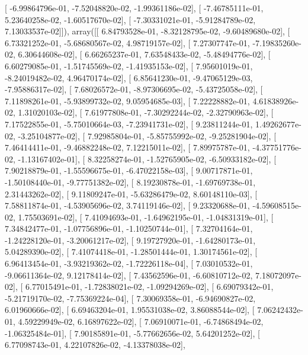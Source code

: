 \documentclass{article}
\begin{document}
       [ -6.99864796e-01,  -7.52048820e-02,  -1.99361186e-02],
       [ -7.46785111e-01,   5.23640258e-02,  -1.60517670e-02],
       [ -7.30331021e-01,  -5.91284789e-02,   7.13033537e-02]]), array([[  6.84793528e-01,  -8.32128795e-02,  -9.60489680e-02],
       [  6.73321252e-01,  -5.68680567e-02,   4.98719157e-02],
       [  7.27307747e-01,  -7.19835260e-02,   6.30644608e-02],
       [  6.66265237e-01,   7.63548433e-02,  -5.48494776e-02],
       [  6.60279085e-01,  -1.51745569e-02,  -1.41935153e-02],
       [  7.95601019e-01,  -8.24019482e-02,   4.96470174e-02],
       [  6.85641230e-01,  -9.47065129e-03,  -7.95886317e-02],
       [  7.68026572e-01,  -8.97306695e-02,  -5.43725058e-02],
       [  7.11898261e-01,  -5.93899732e-02,   9.05954685e-03],
       [  7.22228882e-01,   4.61838926e-02,   1.31020103e-02],
       [  7.61977808e-01,  -7.30292244e-02,  -2.32790963e-02],
       [  7.17522855e-01,  -5.75010664e-03,  -7.23941731e-02],
       [  9.23811244e-01,   1.49262677e-02,  -3.25104877e-02],
       [  7.92985804e-01,  -5.85755992e-02,  -9.25281904e-02],
       [  7.46414411e-01,  -9.46882248e-02,   7.12215011e-02],
       [  7.89975787e-01,  -4.37751776e-02,  -1.13167402e-01],
       [  8.32258274e-01,  -1.52765905e-02,  -6.50933182e-02],
       [  7.90218879e-01,  -1.55596675e-01,  -6.47022158e-03],
       [  9.00717871e-01,  -1.50108440e-01,  -9.77751382e-02],
       [  8.19230878e-01,  -1.69769738e-01,   2.31443262e-02],
       [  9.11809247e-01,  -5.63286479e-02,   8.60148110e-03],
       [  7.58811874e-01,  -4.53905696e-02,   3.74119146e-02],
       [  9.23320688e-01,  -4.59608515e-02,   1.75503691e-02],
       [  7.41094693e-01,  -1.64962195e-01,  -1.04831319e-01],
       [  7.34842477e-01,  -1.07756896e-01,  -1.10250744e-01],
       [  7.32704164e-01,  -1.24228120e-01,  -3.20061217e-02],
       [  9.19727920e-01,  -1.64280173e-01,   5.04289390e-02],
       [  7.41074418e-01,  -1.28501444e-01,   1.30174561e-02],
       [  6.96413454e-01,  -3.93219362e-02,  -1.72226118e-04],
       [  7.03010532e-01,  -9.06611364e-02,   9.12178414e-02],
       [  7.43562596e-01,  -6.60810712e-02,   7.18072097e-02],
       [  6.77015491e-01,  -1.72838021e-02,  -1.09294269e-02],
       [  6.69079342e-01,  -5.21719170e-02,  -7.75369224e-04],
       [  7.30069358e-01,  -6.94690827e-02,   6.01960666e-02],
       [  6.69463204e-01,   1.95531038e-02,   3.86088544e-02],
       [  7.06242432e-01,   4.59229949e-02,   6.16897622e-02],
       [  7.06910071e-01,  -6.74868494e-02,  -1.06325484e-01],
       [  7.90185891e-01,  -5.77662656e-02,   5.64201252e-02],
       [  6.77098743e-01,   4.22107826e-02,  -4.13378038e-02],
\end{document}
